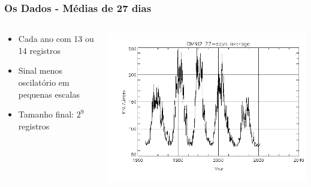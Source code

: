 \documentclass{beamer}
\begin{document}
\begin{frame}
\frametitle{Os Dados - Médias de 27 dias}
\begin{columns}
\begin{column}{0.4\textwidth}
\begin{itemize}
\item Cada ano com 13 ou 14 registros
\item Sinal menos oscilatório em pequenas escalas
\item Tamanho final: $2^{9}$ registros
\end{itemize}
\end{column}
\begin{column}{0.6\textwidth}  %
    \begin{center}
     \includegraphics[scale=0.55]{Figuras/jpg_omni2_27day_bdhxX8pSxb.jpg}
     \end{center}
\end{column}
\end{columns}
\end{frame}
\end{document}
